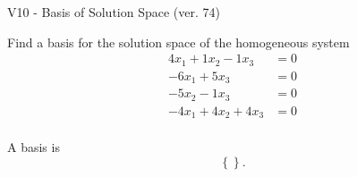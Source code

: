 \begin{exercise}
  \begin{exerciseTitle}V10 - Basis of Solution Space (ver. 74)\end{exerciseTitle}
  \begin{exerciseStatement}
    Find a basis for the solution space of the homogeneous system 
\begin{align*}
 4 x_ 1 + 1 x_ 2 -1 x_ 3 &= 0  \\ 
  -6 x_ 1 + 5 x_ 3 &= 0  \\ 
  -5 x_ 2 -1 x_ 3 &= 0  \\ 
  -4 x_ 1 + 4 x_ 2 + 4 x_ 3 &= 0  \\ 
 \end{align*}


 
  \end{exerciseStatement}

  \begin{exerciseAnswer}
   A basis is   
\[\left\{\right\}.\]

  


  \end{exerciseAnswer}
\end{exercise}